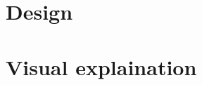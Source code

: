 \documentclass{article}
\begin{document}
\qquad


\section{Design}
\label{sec:Design}

\section{Visual explaination}


\end{document}
